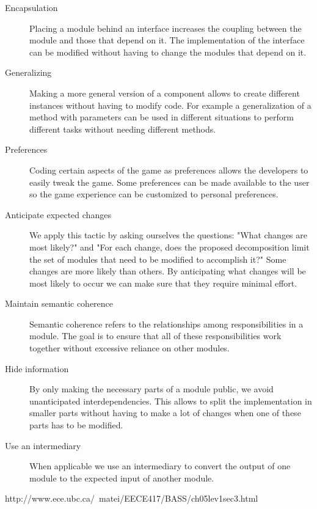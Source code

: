 	\begin{description}
		\item [Encapsulation]
			Placing a module behind an interface increases the coupling between the module and those that depend on it. The implementation of the interface can be modified without having to change the modules that depend on it.
		\item [Generalizing]
			Making a more general version of a component allows to create different instances without having to modify code. For example a generalization of a method with parameters can be used in different situations to perform different tasks without needing different methods.
		\item [Preferences]
			Coding certain aspects of the game as preferences allows the developers to easily tweak the game. Some preferences can be made available to the user so the game experience can be customized to personal preferences.
		\item [Anticipate expected changes]
			We apply this tactic by asking ourselves the questions: "What changes are most likely?" and "For each change, does the proposed decomposition limit the set of modules that need to be modified to accomplish it?" Some changes are more likely than others. By anticipating what changes will be most likely to occur we can make sure that they require minimal effort.
		\item [Maintain semantic coherence]
			Semantic coherence refers to the relationships among responsibilities in a module. The goal is to ensure that all of these responsibilities work together without excessive reliance on other modules. 
		\item [Hide information]
			By only making the necessary parts of a module public, we avoid unanticipated interdependencies. This allows to split the implementation in smaller parts without having to make a lot of changes when one of these parts has to be modified.
		\item [Use an intermediary]
		When applicable we use an intermediary to convert the output of one module to the expected input of another module.
	\end{description}
	
	http://www.ece.ubc.ca/~matei/EECE417/BASS/ch05lev1sec3.html
	
		
